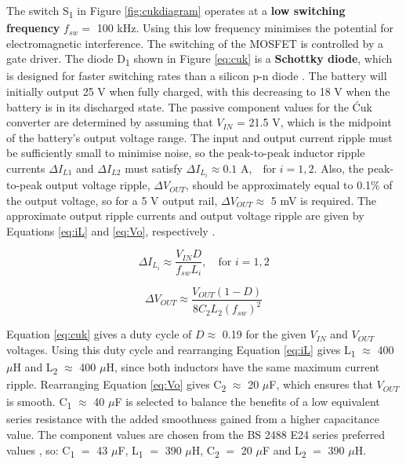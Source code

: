 The switch S\textsubscript{1} in Figure \ref{fig:cukdiagram} operates at a \textbf{low switching frequency} $f_{sw} =$ 100 kHz. Using this low frequency minimises the potential for electromagnetic interference. The switching of the \acrshort{MOSFET} is controlled by a gate driver. The diode D\textsubscript{1} shown in Figure \ref{eq:cuk} is a \textbf{Schottky diode}, which is designed for faster switching rates than a silicon p-n diode \cite{Schottky}. The battery will initially output 25 V when fully charged, with this decreasing to 18 V when the battery is in its discharged state. The passive component values for the Ćuk converter are determined by assuming that $V_{IN}$ = 21.5 V, which is the midpoint of the battery's output voltage range. The input and output current ripple must be sufficiently small to minimise noise, so the peak-to-peak inductor ripple currents $\Delta I_{L1}$ and $\Delta I_{L2}$ must satisfy $\Delta I_{L_{i}} \approx 0.1$ A,$\quad \text{for } i = 1, 2$. Also, the peak-to-peak output voltage ripple, $\Delta V_{OUT}$, should be approximately equal to 0.1\% of the output voltage, so for a 5 V output rail,  $\Delta V_{OUT} \approx $ 5 mV is required. The approximate output ripple currents and output voltage ripple are given by Equations \ref{eq:iL} and \ref{eq:Vo}, respectively \cite{EricksonRobertW2020FoPE}.

\begin{equation}
\Delta I_{L_{i}} \approx \frac{ V_{IN} D}{ f_{sw} L_i}, \quad \text{for } i = 1, 2
\label{eq:iL}
\end{equation}

\begin{equation}
\Delta V_{OUT} \approx \frac{V_{OUT} (1 - D)}{8C_2 L_2 (f_{sw})^2}
\label{eq:Vo}
\end{equation}


Equation \ref{eq:cuk} gives a duty cycle of $D \approx$ 0.19 for the given $V_{IN}$ and $V_{OUT}$ voltages. Using this duty cycle and rearranging Equation \ref{eq:iL} gives L\textsubscript{1} $\approx$ 400 $\mu$H and L\textsubscript{2} $\approx$ 400 $\mu$H, since both inductors have the same maximum current ripple. Rearranging Equation \ref{eq:Vo} gives C\textsubscript{2} $\approx$ 20 $\mu$F, which ensures that $V_{OUT}$ is smooth. C\textsubscript{1} $\approx$ 40 $\mu$F is selected to balance the benefits of a low equivalent series resistance with the added smoothness gained from a higher capacitance value.  The component values are chosen from the \acrshort{BS} 2488 E24 series preferred values \cite{HLT}, so: C\textsubscript{1} $=$ 43 $\mu$F, L\textsubscript{1} $=$ 390 $\mu$H, C\textsubscript{2} $=$ 20 $\mu$F and  L\textsubscript{2} $=$ 390 $\mu$H. 

